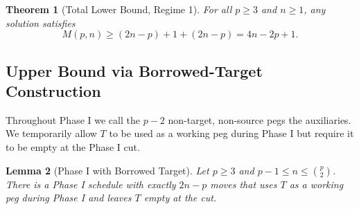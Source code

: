 \documentclass[11pt]{article}
\newtheorem{theorem}{Theorem}
\newtheorem{lemma}[theorem]{Lemma}
\theoremstyle{definition}
\begin{document}
\begin{theorem}[Total Lower Bound, Regime 1]\label{thm:lower-regime1}
For all $p \geq 3$ and $n \geq 1$, any solution satisfies
\[
M(p,n) \geq (2n-p) + 1 + (2n-p) = 4n - 2p + 1.
\]
\end{theorem}

\subsection{Upper Bound via Borrowed-Target Construction}

Throughout Phase I we call the $p-2$ non-target, non-source pegs the auxiliaries. We temporarily allow $T$ to be used as a working peg during Phase I but require it to be empty at the Phase I cut.

\begin{lemma}[Phase I with Borrowed Target]\label{lem:borrow-target}
Let $p \geq 3$ and $p-1 \leq n \leq \binom{p}{2}$. There is a Phase I schedule with exactly $2n-p$ moves that uses $T$ as a working peg during Phase I and leaves $T$ empty at the cut.
\end{lemma}
\end{document}
